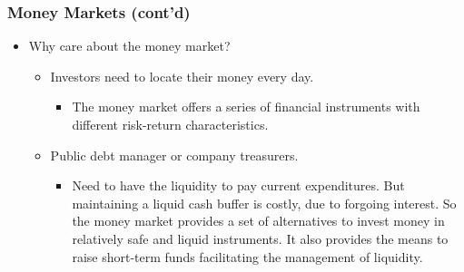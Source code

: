 \documentclass[10pt]{beamer}
\begin{document}
	\begin{frame}
		\frametitle{Money Markets (cont'd)}
		
		\begin{itemize}
			\item Why care about the money market?
			
			\begin{itemize} \vspace{5pt} \itemsep10pt
				\item Investors need to locate their money every day. 
				\begin{itemize}  \vspace{5pt} \itemsep10pt
					\item The money market offers a series of financial instruments with different risk-return characteristics.
				\end{itemize}
				
				\item Public debt manager or company treasurers.
				\begin{itemize}  \vspace{5pt} \itemsep10pt
					\item Need to have the liquidity to pay current expenditures. But maintaining a liquid cash buffer is costly, due to forgoing interest. So the money market provides a set of alternatives to invest money in relatively safe and liquid instruments. It also provides the means to raise short-term funds facilitating the management of liquidity.
				\end{itemize} 
			\end{itemize}
			
		\end{itemize}
		
	\end{frame}
	
	
	
\end{document}

